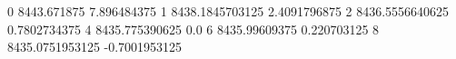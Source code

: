 0 8443.671875 7.896484375
1 8438.1845703125 2.4091796875
2 8436.5556640625 0.7802734375
4 8435.775390625 0.0
6 8435.99609375 0.220703125
8 8435.0751953125 -0.7001953125
